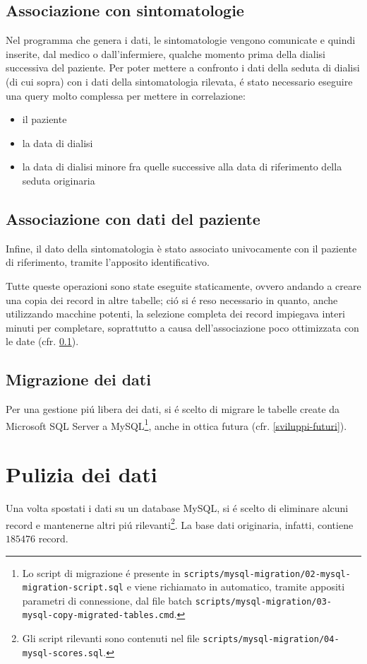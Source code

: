 \documentclass[preprint]{acm_proc_article-sp}
\begin{document}
\subsection{Associazione con sintomatologie}
\label{associazione-sintomi}
Nel programma che genera i dati, le sintomatologie vengono comunicate e quindi inserite, dal medico o dall'infermiere, qualche momento prima della dialisi successiva del paziente. 
Per poter mettere a confronto i dati della seduta di dialisi (di cui sopra) con i dati della sintomatologia rilevata, \'e stato necessario eseguire una query molto complessa per mettere in correlazione:
\begin{itemize}
\item il paziente
\item la data di dialisi
\item la data di dialisi minore fra quelle successive alla data di riferimento della seduta originaria
\end{itemize}

\subsection{Associazione con dati del paziente}
Infine, il dato della sintomatologia è stato associato univocamente con il paziente di riferimento, tramite l'apposito identificativo.

Tutte queste operazioni sono state eseguite staticamente, ovvero andando a creare una copia dei record in altre tabelle; ci\'o si \'e reso necessario in quanto, anche utilizzando macchine potenti, la selezione completa dei record impiegava interi minuti per completare, soprattutto a causa dell'associazione poco ottimizzata con le date (cfr. \ref{associazione-sintomi}).

\subsection{Migrazione dei dati}
Per una gestione pi\'u libera dei dati, si \'e scelto di migrare le tabelle create da Microsoft SQL Server a MySQL\footnote{Lo script di migrazione \'e presente in \texttt{scripts/mysql-migration/02-mysql-migration-script.sql} e viene richiamato in automatico, tramite appositi parametri di connessione, dal file batch \texttt{scripts/mysql-migration/03-mysql-copy-migrated-tables.cmd}.}, anche in ottica futura (cfr. \ref{sviluppi-futuri}).

\section{Pulizia dei dati}
\label{pulizia-dati}
Una volta spostati i dati su un database MySQL, si \'e scelto di eliminare alcuni record e mantenerne altri pi\'u rilevanti\footnote{Gli script rilevanti sono contenuti nel file \texttt{scripts/mysql-migration/04-mysql-scores.sql}.}. La base dati originaria, infatti, contiene $185476$ record.
\end{document}
